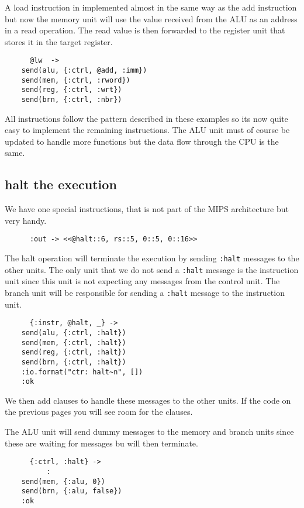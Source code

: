 \documentclass[a4paper,11pt]{article}
\begin{document}
A load instruction in implemented almost in the same way as the add
instruction but now the memory unit will use the value received from
the ALU as an address in a read operation. The read value is then
forwarded to the register unit that stores it in the target register.


\begin{verbatim}
      @lw  ->
	send(alu, {:ctrl, @add, :imm})
	send(mem, {:ctrl, :rword})
	send(reg, {:ctrl, :wrt})
	send(brn, {:ctrl, :nbr})
\end{verbatim}

All instructions follow the pattern described in these examples so its
now quite easy to implement the remaining instructions. The ALU unit
must of course be updated to handle more functions but the data flow
through the CPU is the same.

\subsection*{halt the execution}


We have one special instructions, that is not part of the MIPS
architecture but very handy.

\begin{verbatim}
      :out -> <<@halt::6, rs::5, 0::5, 0::16>>
\end{verbatim}

The halt operation will terminate the
execution by sending {\tt :halt} messages to the other units. The only
unit that we do not send a {\tt :halt} message is the instruction unit
since this unit is not expecting any messages from the control
unit. The branch unit will be responsible for sending a {\tt :halt}
message to the instruction unit.

\begin{verbatim}
      {:instr, @halt, _} ->
	send(alu, {:ctrl, :halt})
	send(mem, {:ctrl, :halt})
	send(reg, {:ctrl, :halt})
	send(brn, {:ctrl, :halt})
	:io.format("ctr: halt~n", [])
	:ok
\end{verbatim}

We then add clauses to handle these  messages to the other units. If the code on the
previous pages you will see room for the clauses.

The ALU unit will send dummy messages to the memory and branch units
since these are waiting for messages bu will then terminate.

\begin{verbatim}
      {:ctrl, :halt} ->
          :
	send(mem, {:alu, 0})		
	send(brn, {:alu, false})
	:ok
\end{verbatim}
      
\end{document}
